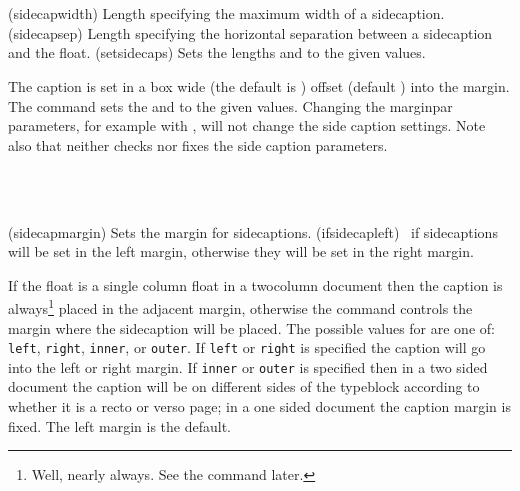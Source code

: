 \begin{syntax}
\lnc{\sidecapwidth} \lnc{\sidecapsep} \\
\cmd{\setsidecaps} \\
\end{syntax}
\glossary(sidecapwidth)%
  {}%
  {Length specifying the maximum width of a sidecaption.}%
\glossary(sidecapsep)%
  {}%
  {Length specifying the horizontal separation between a sidecaption and the float.}%
\glossary(setsidecaps)%
  {}%
  {Sets the lengths  and  to the given
   values.}%

The caption is set in a box \lnc{\sidecapwidth} wide (the default is
\lnc{\marginparwidth}) offset \lnc{\sidecapsep} (default \lnc{\marginparsep})
into the margin.
The command \cmd{\setsidcaps} sets the \lnc{\sidecapsep} and 
\lnc{\sidecapwidth} to the given values. Changing the marginpar parameters,
for example with \cmd{\setmarginnotes}, will not change the side caption
settings. Note also that \cmd{\checkandfixthelayout}
neither checks nor fixes the side caption parameters.

\begin{syntax}
\cmd{\sidecapmargin} \\
   \\
\end{syntax}
\glossary(sidecapmargin)%
  {}%
  {Sets the margin for sidecaptions.}%
\glossary(ifsidecapleft)%
  {}%
  {\ptrue\ if sidecaptions will be set in the left margin,
    otherwise they will be set in the right margin.}%

    If the float is a single column float in a twocolumn document then
the caption is 
always\footnote{Well, nearly always. See the  command 
later.}
placed in the adjacent margin, otherwise the \cmd{\sidecapmargin} command
controls the margin where the sidecaption will be placed. 
The possible values for  are one of: 
\texttt{left}, 
\texttt{right},
\texttt{inner}, or
\texttt{outer}.
If \texttt{left} or \texttt{right} is specified the caption will go into
the left or right margin. If \texttt{inner} or \texttt{outer} is specified
then in a two sided document the caption will be on different sides of the
typeblock according to whether it is a recto or verso page; in a one sided
document the caption margin is fixed. The left margin is the default.

